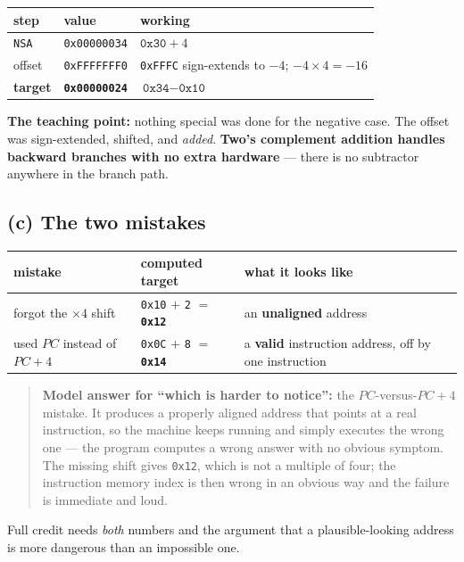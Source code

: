 \documentclass[11pt]{article}
\newcommand{\code}[1]{\texttt{#1}}
\begin{document}
\begin{center}
\begin{tabular}{lll}
\toprule
step & value & working \\
\midrule
\code{NSA} & \code{0x00000034} & $\code{0x30} + 4$ \\
offset & \code{0xFFFFFFF0} & \code{0xFFFC} sign-extends to $-4$; $-4 \times 4 = -16$ \\
\textbf{target} & \textbf{\code{0x00000024}} & $\code{0x34} - \code{0x10}$ \\
\bottomrule
\end{tabular}
\end{center}

\textbf{The teaching point:} nothing special was done for the negative case. The
offset was sign-extended, shifted, and \emph{added}. \textbf{Two's complement
addition handles backward branches with no extra hardware} --- there is no
subtractor anywhere in the branch path.

\subsection*{(c) The two mistakes}

\begin{center}
\begin{tabular}{lll}
\toprule
mistake & computed target & what it looks like \\
\midrule
forgot the $\times 4$ shift & \code{0x10} $+$ \code{2} $=$ \textbf{\code{0x12}} & an \textbf{unaligned} address \\
used $PC$ instead of $PC+4$ & \code{0x0C} $+$ \code{8} $=$ \textbf{\code{0x14}} & a \textbf{valid} instruction address, off by one instruction \\
\bottomrule
\end{tabular}
\end{center}

\begin{quote}
\textbf{Model answer for ``which is harder to notice'':} the $PC$-versus-$PC+4$
mistake. It produces a properly aligned address that points at a real
instruction, so the machine keeps running and simply executes the wrong one ---
the program computes a wrong answer with no obvious symptom. The missing shift
gives \code{0x12}, which is not a multiple of four; the instruction memory index
is then wrong in an obvious way and the failure is immediate and loud.
\end{quote}

Full credit needs \emph{both} numbers and the argument that a plausible-looking
address is more dangerous than an impossible one.
\end{document}

